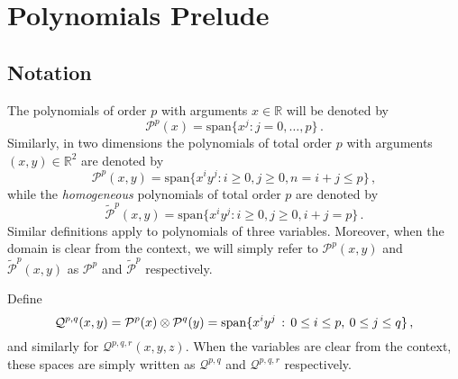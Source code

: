 \section{Polynomials Prelude}
\label{sec:Notation}

\subsection{Notation}



The polynomials of order $p$ with arguments $x\in\mathbb{R}$ will be denoted by
\begin{equation}
   	\mathcal{P}^p(x)=\mathrm{span}\{x^j:j=0,\ldots,p\}\,.
\end{equation}
Similarly, in two dimensions  the polynomials of total order $p$ with arguments $(x,y)\in\mathbb{R}^2$ are denoted by
\begin{equation}
    \mathcal{P}^p(x,y)=\mathrm{span}\{x^iy^j:i\geq0,j\geq0,n=i+j\leq p\}\,,
\end{equation}
while the \textit{homogeneous} polynomials of total order $p$ are denoted by
\begin{equation}
    \tilde{\mathcal{P}}^p(x,y)=\mathrm{span}\{x^iy^j:i\geq0,j\geq0,i+j=p\}\,.
\end{equation}
Similar definitions apply to polynomials of three variables. 
Moreover, when the domain is clear from the context, we will simply refer to $\mathcal{P}^p(x,y)$ and $\tilde{\mathcal{P}}^p(x,y)$ as $\mathcal{P}^p$ and $\tilde{\mathcal{P}}^p$ respectively.

Define
\begin{equation}
 \mathcal{Q}^{p,q}(x,y)=\mathcal{P}^p(x)\otimes\mathcal{P}^q(y)
        =\operatorname{span}\{x^i y^j \,:\,0\leq i\leq p,\:0\leq j\leq q\}\,,
\end{equation}
and similarly for $\mathcal{Q}^{p,q,r}(x,y,z)$. When the variables are clear from the context, these spaces are simply written as $\mathcal{Q}^{p,q}$ and $\mathcal{Q}^{p,q,r}$ respectively.

